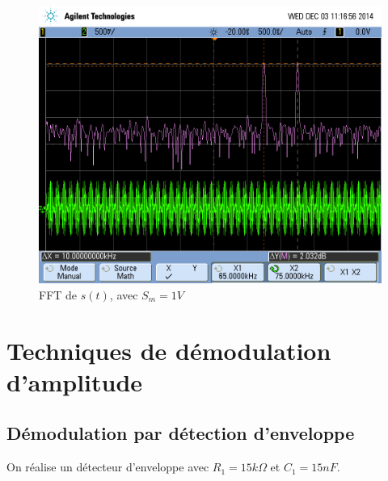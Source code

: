 \documentclass[../../Cours_M1.tex]{subfiles}
\begin{document}
\begin{figure}[h!]
\centering
\includegraphics[scale=0.2]{DBPS5FFT.png}
\caption{FFT de $s(t)$, avec $S_m=1V$}
\end{figure}

\newpage
\section{Techniques de démodulation d'amplitude}

\subsection{Démodulation par détection d'enveloppe}

On réalise un détecteur d'enveloppe avec $R_1=15k\Omega$ et $C_1=15nF$.\\
\end{document}
